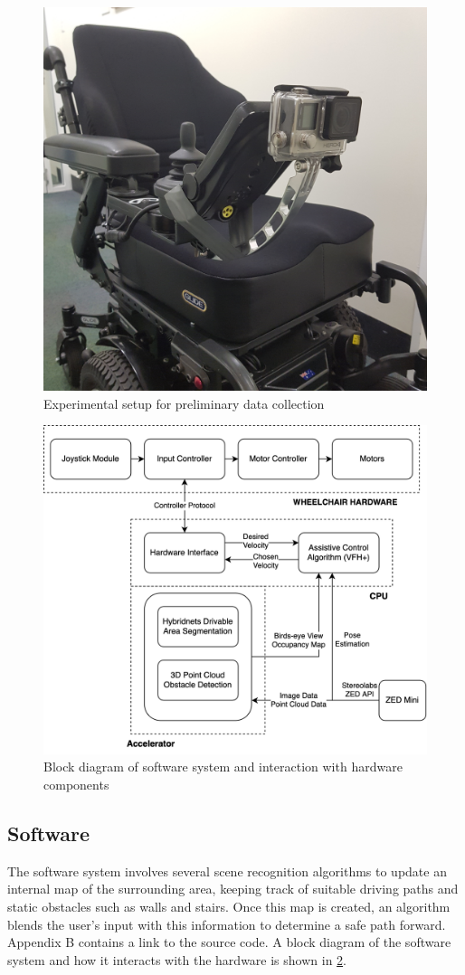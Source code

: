 \begin{figure}[p]
    \centering
    \includegraphics[width=0.45\linewidth,angle=270,origin=c]{images/gopro_dataset_collection.jpg}
    \caption{Experimental setup for preliminary data collection}
    \label{fig:gopro_dataset_collection}
\end{figure}

\begin{figure}[p]
    \centering
    \includegraphics[width=0.8\linewidth]{images/block_diagram.png}
    \caption{Block diagram of software system and interaction with hardware components}
    \label{fig:block_diagram}
\end{figure}\clearpage

\subsection{Software}
The software system involves several scene recognition algorithms to update an internal
map of the surrounding area, keeping track of suitable driving paths and static obstacles
such as walls and stairs. Once this map is created, an algorithm blends the
user's input with this information to determine a safe path forward.
Appendix B contains a link to the source code. A block diagram of the software system
and how it interacts with the hardware is shown in \cref{fig:block_diagram}.

